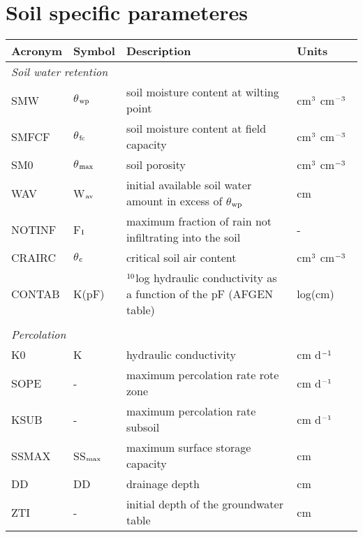\section*{Soil specific parameteres}

\small
\begin{longtable}[c]{
		p{0.15\linewidth}p{0.1\linewidth}p{0.55\linewidth}p{0.2\linewidth}
	}\hline \hline
\textbf{Acronym} & \textbf{Symbol} & \textbf{Description} & \textbf{Units}\\
\hline

\multicolumn{4}{l}{\textit{Soil water retention}}\\   
SMW & $\theta$$_{{\rm wp}}$ & soil moisture content at wilting point    &
   cm$^{{\rm 3}}$ cm$^{{\rm -3}}$\\
SMFCF & $\theta$$_{{\rm fc}}$ & soil moisture content at field capacity   &
   cm$^{{\rm 3}}$ cm$^{{\rm -3}}$\\
SM0 & $\theta$$_{{\rm max}}$ & soil porosity   &    cm$^{{\rm 3}}$ cm$^{{\rm -3}}$\\
WAV & W$_{{\rm av}}$ & initial available soil water amount in excess of 
   $\theta$$_{{\rm wp}}$   &    cm\\
NOTINF & F$_{{\rm I}}$ & maximum fraction of rain not infiltrating into the 
   soil   &    -\\
CRAIRC & $\theta$$_{{\rm c}}$ & critical soil air content    &
   cm$^{{\rm 3}}$ cm$^{{\rm -3}}$\\
CONTAB & K(pF) & $^{{\rm 10}}$log hydraulic conductivity as a function of the pF 
(AFGEN table)   &    log(cm)\\
\\

\multicolumn{4}{l}{\textit{Percolation}}\\   
K0 & K & hydraulic conductivity   &    cm d$^{{\rm -1}}$\\
SOPE & - & maximum percolation rate rote zone   &    cm d$^{{\rm -1}}$\\
KSUB & - & maximum percolation rate subsoil   &    cm d$^{{\rm -1}}$\\
SSMAX & SS$_{{\rm max}}$ & maximum surface storage capacity   &    cm\\
DD & DD & drainage depth   &    cm\\
ZTI & - & initial depth of the groundwater table   &    cm\\

\hline \hline

\end{longtable}
\normalfont
